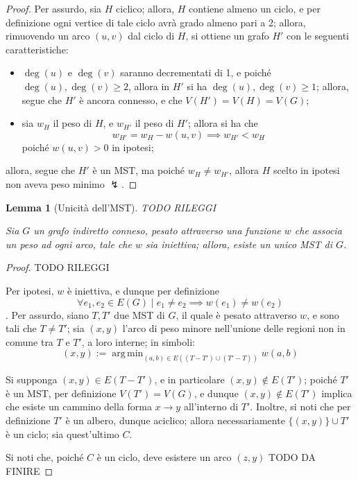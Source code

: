 \documentclass[14pt]{extreport}
\DeclareMathOperator*{\argmin}{arg\,min}
\newtheorem{lemma}{Lemma}[subsection]
\theoremstyle{definition}
\theoremstyle{definition}
\begin{document}
\begin{proof}
    Per assurdo, sia $H$ ciclico; allora, $H$ contiene almeno un ciclo, e per definizione ogni vertice di tale ciclo avrà grado almeno pari a 2; allora, rimuovendo un arco $(u, v)$ dal ciclo di $H$, si ottiene un grafo $H'$ con le seguenti caratteristiche:

    \begin{itemize}
        \item $\deg(u)$ e $\deg(v)$ saranno decrementati di 1, e poiché $\deg(u), \deg(v) \ge 2$, allora in $H'$ si ha $\deg(u), \deg(v) \ge 1$; allora, segue che $H'$ è ancora connesso, e che $V(H') = V(H) = V(G)$;
        \item sia $w_H$ il peso di $H$, e $w_{H'}$ il peso di $H'$; allora si ha che $$w_{H'} = w_H - w(u, v) \implies w_{H'} < w_H$$ poiché $w(u, v) > 0$ in ipotesi;
    \end{itemize}

    allora, segue che $H'$ è un MST, ma poiché $w_H \neq w_{H'}$, allora $H$ scelto in ipotesi non aveva peso minimo $\lightning$.
\end{proof}

\begin{lemma}[Unicità dell'MST]
    TODO RILEGGI

    Sia $G$ un grafo indiretto conneso, pesato attraverso una funzione $w$ che associa un peso ad ogni arco, tale che $w$ sia iniettiva; allora, esiste un unico MST di $G$.
\end{lemma}

\begin{proof}
    TODO RILEGGI

    Per ipotesi, $w$ è iniettiva, e dunque per definizione $$\forall e_1, e_2 \in E(G) \mid e_1 \neq e_2 \implies w(e_1) \neq w(e_2)$$. Per assurdo, siano $T, T'$ due MST di $G$, il quale è pesato attraverso $w$, e sono tali che $T \neq T'$; sia $(x, y)$ l'arco di peso minore nell'unione delle regioni non in comune tra $T$ e $T'$, a loro interne; in simboli: $$(x, y) := \argmin_{(a, b) \in E((T - T') \cup (T' - T))}{w(a, b)}$$

    Si supponga $(x, y) \in E(T - T')$, e in particolare $(x, y) \notin E(T')$; poiché $T'$ è un MST, per definizione $V(T') = V(G)$, e dunque $(x, y) \notin E(T')$ implica che esiste un cammino della forma $x \rightarrow y$ all'interno di $T'$. Inoltre, si noti che per definizione $T'$ è un albero, dunque aciclico; allora necessariamente $\{(x, y)\} \cup T'$ è un ciclo; sia quest'ultimo $C$.

    Si noti che, poiché $C$ è un ciclo, deve esistere un arco $(z, y)$ TODO DA FINIRE
\end{proof}
\end{document}
